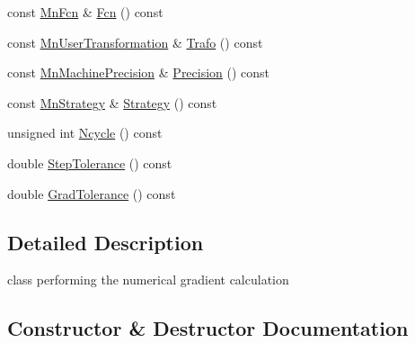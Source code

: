 \begin{DoxyCompactItemize}
const \mbox{\hyperlink{classROOT_1_1Minuit2_1_1MnFcn}{Mn\+Fcn}} \& \mbox{\hyperlink{classROOT_1_1Minuit2_1_1Numerical2PGradientCalculator_a84287ad0b3e0b38769c3ecb00cac1c22}{Fcn}} () const
\item 
const \mbox{\hyperlink{classROOT_1_1Minuit2_1_1MnUserTransformation}{Mn\+User\+Transformation}} \& \mbox{\hyperlink{classROOT_1_1Minuit2_1_1Numerical2PGradientCalculator_a5a0bce9f2c00da4aae9a2b6d3b706010}{Trafo}} () const
\item 
const \mbox{\hyperlink{classROOT_1_1Minuit2_1_1MnMachinePrecision}{Mn\+Machine\+Precision}} \& \mbox{\hyperlink{classROOT_1_1Minuit2_1_1Numerical2PGradientCalculator_a2f964953d797badaf6f2cd476e330c3f}{Precision}} () const
\item 
const \mbox{\hyperlink{classROOT_1_1Minuit2_1_1MnStrategy}{Mn\+Strategy}} \& \mbox{\hyperlink{classROOT_1_1Minuit2_1_1Numerical2PGradientCalculator_a71eb0622c53ddf5d3d319fa676cbbd6e}{Strategy}} () const
\item 
unsigned int \mbox{\hyperlink{classROOT_1_1Minuit2_1_1Numerical2PGradientCalculator_ace5b19ee0df4e3cd09333f519112d2b3}{Ncycle}} () const
\item 
double \mbox{\hyperlink{classROOT_1_1Minuit2_1_1Numerical2PGradientCalculator_afb1bbda7e079db02b02b790e0b0f6cca}{Step\+Tolerance}} () const
\item 
double \mbox{\hyperlink{classROOT_1_1Minuit2_1_1Numerical2PGradientCalculator_aa0011cbece7254c7e17f053916e01c65}{Grad\+Tolerance}} () const
\end{DoxyCompactItemize}


\subsection{Detailed Description}
class performing the numerical gradient calculation 

\subsection{Constructor \& Destructor Documentation}
\mbox{\label{classROOT_1_1Minuit2_1_1Numerical2PGradientCalculator_ab9e5f93630233d189cb8856753a2cff8}} 
